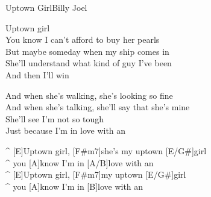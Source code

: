 \begin{song}{Uptown Girl}{Billy Joel}
\begin{guitar}
Uptown girl\\
You know I can't afford to buy her pearls\\
But maybe someday when my ship comes in\\
She'll understand what kind of guy I've been\\
And then I'll win\\
\end{guitar}

\begin{guitar}
And when she's walking, she's looking so fine\\
And when she's talking, she'll say that she's mine\\
She'll see I'm not so tough\\
Just because I'm in love with an\\
\end{guitar}



\begin{guitar}
^ [E]Uptown girl, [F#m7]she's my uptown [E/G#]girl\\
^ you [A]know I'm in [A/B]love with an\\
^ [E]Uptown girl, [F#m7]my uptown [E/G#]girl\\
^ you [A]know I'm in [B]love with an \\
\end{guitar}
\end{song}
